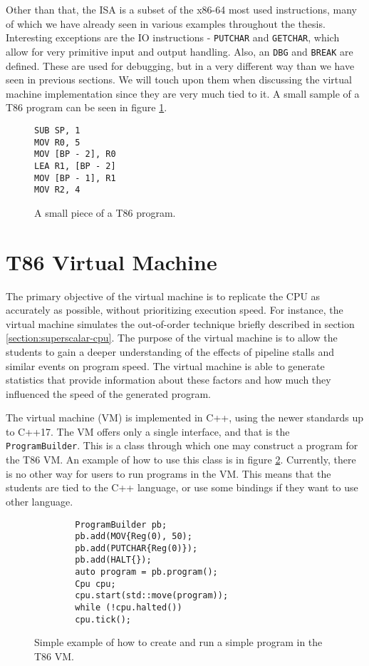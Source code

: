 Other than that, the ISA is a subset of the x86-64 most used instructions, many
of which we have already seen in various examples throughout the thesis.
Interesting exceptions are the IO instructions - \texttt{PUTCHAR} and
\texttt{GETCHAR}, which allow for very primitive input and output handling.
Also, an \texttt{DBG} and \texttt{BREAK} are defined. These are used for
debugging, but in a very different way than we have seen in previous sections.
We will touch upon them when discussing the virtual machine implementation
since they are very much tied to it. A small sample of a T86 program can be
seen in figure \ref{fig:t86-example}.

\begin{figure}
    \begin{lstlisting}
SUB SP, 1
MOV R0, 5
MOV [BP - 2], R0
LEA R1, [BP - 2]
MOV [BP - 1], R1
MOV R2, 4
    \end{lstlisting}
    \caption{A small piece of a T86 program.}
    \label{fig:t86-example}
\end{figure}

\section{T86 Virtual Machine}\label{section:t86-vm}
The primary objective of the virtual machine is to replicate the CPU as
accurately as possible, without prioritizing execution speed. For instance, the
virtual machine simulates the out-of-order technique briefly described in
section \ref{section:superscalar-cpu}. The purpose of the virtual machine is to
allow the students to gain a deeper understanding of the effects of pipeline
stalls and similar events on program speed. The virtual machine is able to
generate statistics that provide information about these factors and how
much they influenced the speed of the generated program.

The virtual machine (VM) is implemented in C++, using the newer standards up to
C++17. The VM offers only a single interface, and that is the
\texttt{ProgramBuilder}. This is a class through which one may construct a
program for the T86 VM. An example of how to use this class is in figure
\ref{fig:t86-intro}. Currently, there is no other way for users to run programs
in the VM. This means that the students are tied to the C++ language, or use
some bindings if they want to use other language.

\begin{figure}
    \begin{verbatim}
        ProgramBuilder pb;
        pb.add(MOV{Reg(0), 50);
        pb.add(PUTCHAR{Reg(0)});
        pb.add(HALT{});
        auto program = pb.program();
        Cpu cpu;
        cpu.start(std::move(program));
        while (!cpu.halted())
        cpu.tick();
    \end{verbatim}
    \caption{Simple example of how to create and run a simple program in the T86 VM.}
    \label{fig:t86-intro}
\end{figure}

